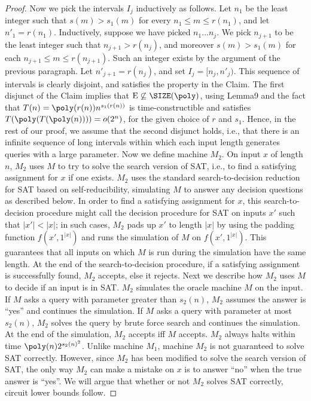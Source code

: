 \begin{proof}
Now we pick the intervals $I_j$ inductively as follows. Let $n_1$ be the least integer such that $s(m)>s_1(m)$ for every $n_1\leq m\leq r(n_1)$, and let $n'_1=r(n_1)$. Inductively, suppose we have picked $n_1\ldots n_j$. We pick $n_{j+1}$ to be the least integer such that $n_{j+1}>r(n_j)$, and moreover $s(m)>s_1(m)$ for each $n_{j+1}\leq m\leq r(n_{j+1})$. Such an integer exists by the argument of the previous paragraph. Let $n'_{j+1}=r(n_j)$, and set $I_j=[n_j,n'_j)$. This sequence of intervals is clearly disjoint, and satisfies the property in the Claim.
The first disjunct of the Claim implies that $\mathrm E\not\subseteq\SIZE(\poly)$, using Lemma9 and the fact that $T(n)=\poly(r(n))n^{s_1(r(n))}$ is time-constructible and satisfies $T(\poly(T(\poly(n))))=o(2^n)$, for the given choice of $r$ and $s_1$. Hence, in the rest of our proof, we assume that the second disjunct holds, i.e., that there is an infinite sequence of long intervals within which each input length generates queries with a large parameter.
Now we define machine $M_2$. On input $x$ of length $n$, $M_2$ uses $M$ to try to solve the search version of SAT, i.e., to find a satisfying assignment for $x$ if one exists. $M_2$ uses the standard search-to-decision reduction for SAT based on self-reducibility, simulating $M$ to answer any decision questions as described below. In order to find a satisfying assignment for $x$, this search-to-decision procedure might call the decision procedure for SAT on inputs $x'$ such that $|x'|<|x|$; in such cases, $M_2$ pads up $x'$ to length $|x|$ by using the padding function $f(x',1^{|x|})$ and runs the simulation of $M$ on $f(x',1^{|x|})$. This guarantees that all inputs on which $M$ is run during the simulation have the same length. At the end of the search-to-decision procedure, if a satisfying assignment is successfully found, $M_2$ accepts, else it rejects.
Next we describe how $M_2$ uses $M$ to decide if an input is in SAT. $M_2$ simulates the oracle machine $M$ on the input. If $M$ asks a query with parameter greater than $s_2(n)$, $M_2$ assumes the answer is ``yes'' and continues the simulation. If $M$ asks a query with parameter at most $s_2(n)$, $M_2$ solves the query by brute force search and continues the simulation. At the end of the simulation, $M_2$ accepts iff $M$ accepts.
$M_2$ always halts within time $\poly(n)2^{s_2(n)^2}$. Unlike machine $M_1$, machine $M_2$ is not guaranteed to solve SAT correctly. However, since $M_2$ has been modified to solve the search version of SAT, the only way $M_2$ can make a mistake on $x$ is to answer ``no'' when the true answer is ``yes''. We will argue that whether or not $M_2$ solves SAT correctly, circuit lower bounds follow.

\end{proof}
